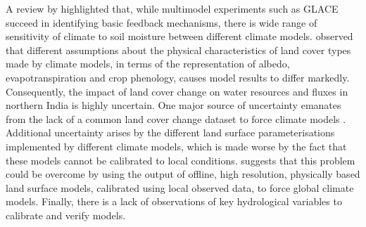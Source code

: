 \documentclass{icldt}
\begin{document}
A review by \citet{Seneviratne2010} highlighted that, while multimodel experiments such as GLACE succeed in identifying basic feedback mechanisms, there is wide range of sensitivity of climate to soil moisture between different climate models. \citet{Pitman2009} observed that different assumptions about the physical characteristics of land cover types made by climate models, in terms of the representation of albedo, evapotranspiration and crop phenology, causes model results to differ markedly. Consequently, the impact of land cover change on water resources and fluxes in northern India is highly uncertain. One major source of uncertainty emanates from the lack of a common land cover change dataset to force climate models \citep{Pitman2009}. Additional uncertainty arises by the different land surface parameterisations implemented by different climate models, which is made worse by the fact that these models cannot be calibrated to local conditions. \citet{Seneviratne2010} suggests that this problem could be overcome by using the output of offline, high resolution, physically based land surface models, calibrated using local observed data, to force global climate models. Finally, there is a lack of observations of key hydrological variables to calibrate and verify models. \\




\end{document}
